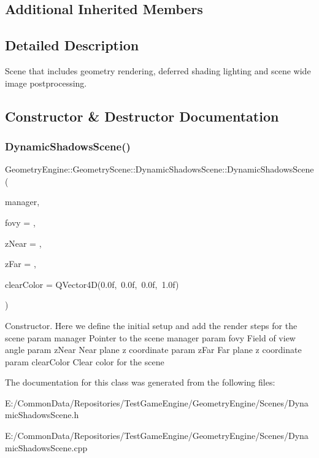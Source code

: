 \subsection*{Additional Inherited Members}


\subsection{Detailed Description}
Scene that includes geometry rendering, deferred shading lighting and scene wide image postprocessing. 

\subsection{Constructor \& Destructor Documentation}
\mbox{\label{class_geometry_engine_1_1_geometry_scene_1_1_dynamic_shadows_scene_a18c947328dafb4e64b8a253f5aab579d}} 
\subsubsection{\texorpdfstring{DynamicShadowsScene()}{DynamicShadowsScene()}}
{\footnotesize\ttfamily Geometry\+Engine\+::\+Geometry\+Scene\+::\+Dynamic\+Shadows\+Scene\+::\+Dynamic\+Shadows\+Scene (\begin{DoxyParamCaption}\item[{\mbox{\hyperlink{class_geometry_engine_1_1_scene_manager}{Scene\+Manager}} $\ast$}]{manager,  }\item[{G\+Ldouble}]{fovy = {},  }\item[{G\+Ldouble}]{z\+Near = {},  }\item[{G\+Ldouble}]{z\+Far = {},  }\item[{Q\+Vector4D}]{clear\+Color = {\ttfamily QVector4D(0.0f,~0.0f,~0.0f,~1.0f)} }\end{DoxyParamCaption})}

Constructor. Here we define the initial setup and add the render steps for the scene param manager Pointer to the scene manager param fovy Field of view angle param z\+Near Near plane z coordinate param z\+Far Far plane z coordinate param clear\+Color Clear color for the scene 

The documentation for this class was generated from the following files\+:\begin{DoxyCompactItemize}
\item 
E\+:/\+Common\+Data/\+Repositories/\+Test\+Game\+Engine/\+Geometry\+Engine/\+Scenes/Dynamic\+Shadows\+Scene.\+h\item 
E\+:/\+Common\+Data/\+Repositories/\+Test\+Game\+Engine/\+Geometry\+Engine/\+Scenes/Dynamic\+Shadows\+Scene.\+cpp\end{DoxyCompactItemize}
